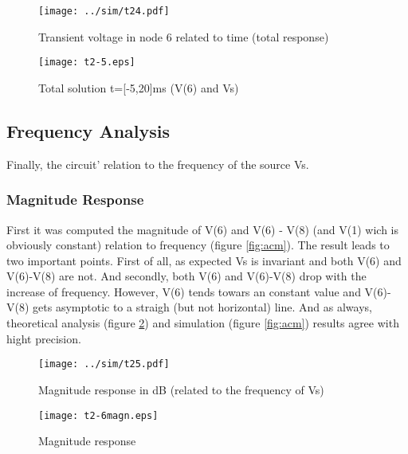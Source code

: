 \begin{figure}[h] \centering
  \begin{minipage}{.5\textwidth}
    \texttt{[image: ../sim/t24.pdf]}
    \caption{Transient voltage in node 6 related to time (total response)}
    \label{fig:trans2}
    \end{minipage}%
  \begin{minipage}{.5\textwidth}
    \vspace{10mm}
  \centering
    \texttt{[image: t2-5.eps]}
    \caption{Total solution t=[-5,20]ms (V(6) and Vs)}
    \label{fig:comptot}
      \end{minipage}%
\end{figure}




\subsection{Frequency Analysis}

Finally, the circuit' relation to the frequency of the source Vs.

\subsubsection{Magnitude Response}

First it was computed the magnitude of V(6) and V(6) - V(8) (and V(1) wich is obviously constant) relation to frequency (figure \ref{fig:acm}). The result leads to two important points. First of all, as expected Vs is invariant and both V(6) and V(6)-V(8) are not. And secondly, both V(6) and V(6)-V(8) drop with the increase of frequency. However, V(6) tends towars an constant value and V(6)-V(8) gets asymptotic to a straigh (but not horizontal) line. And as always, theoretical analysis (figure \ref{fig:compmagn}) and simulation (figure \ref{fig:acm}) results agree with hight precision.



\begin{figure}[h] \centering
  \begin{minipage}{.5\textwidth}
    \texttt{[image: ../sim/t25.pdf]}
    \caption{Magnitude response in dB (related to the frequency of Vs)}
    \label{fig:acm}
    \end{minipage}%
  \begin{minipage}{.5\textwidth}
    \vspace{10mm}
  \centering
    \texttt{[image: t2-6magn.eps]}
    \caption{Magnitude response}
    \label{fig:compmagn}
      \end{minipage}%
\end{figure}

